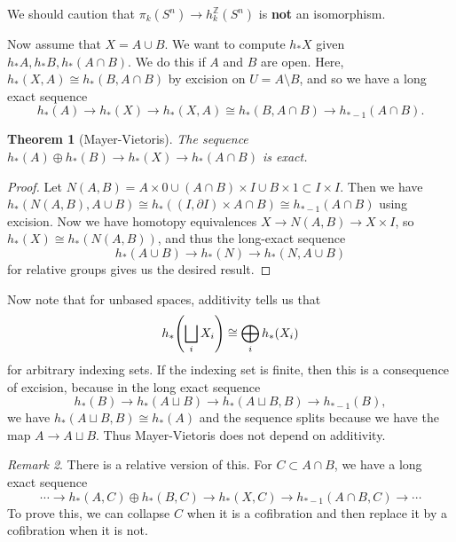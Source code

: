 \documentclass[leqno, openany]{memoir}
\newtheorem{thm}{Theorem}[section]
\theoremstyle{definition}
\theoremstyle{remark}
\newtheorem{rmk}[thm]{Remark}
\theoremstyle{plain}
\theoremstyle{definition}
\theoremstyle{remark}
\newcommand{\Z}{\mathbb{Z}}
\begin{document}
We should caution that $\pi_k(S^n) \to h_k^{\Z}(S^n)$ is \textbf{not} an isomorphism.

Now assume that $X = A \cup B$. We want to compute $h_* X$ given $h_* A, h_* B, h_*(A \cap B)$. We do this if $A$ and $B$ are open. Here, $h_*(X,A) \cong h_*(B, A \cap B)$ by excision on $U = A \setminus B$, and so we have a long exact sequence
\[ h_*(A) \to h_*(X) \to h_*(X,A) \cong h_*(B, A \cap B) \to h_{*-1}(A \cap B). \]

\begin{thm}[Mayer-Vietoris]
    The sequence $h_*(A) \oplus h_*(B) \to h_*(X) \to h_*(A \cap B)$ is exact.
\end{thm}

\begin{proof}
    Let $N(A,B) = A \times 0 \cup (A \cap B) \times I \cup B \times 1 \subset I \times I$. Then we have $h_*(N(A,B), A \cup B) \cong h_*((I, \partial I) \times A \cap B) \cong h_{*-1}(A \cap B)$ using excision. Now we have homotopy equivalences $X \to N(A,B) \to X \times I$, so $h_*(X) \cong h_*(N(A,B))$, and thus the long-exact sequence
    \[ h_*(A \cup B) \to h_*(N) \to h_*(N, A \cup B) \]
    for relative groups gives us the desired result.
\end{proof}

Now note that for unbased spaces, additivity tells us that 
\[ h_*\qty(\bigsqcup_i X_i) \cong \bigoplus_i h_*(X_i) \]
for arbitrary indexing sets. If the indexing set is finite, then this is a consequence of excision, because in the long exact sequence
\[ h_*(B) \to h_*(A \sqcup B) \to h_*(A \sqcup B, B) \to h_{*-1}(B), \]
we have $h_*(A \sqcup B, B) \cong h_*(A)$ and the sequence splits because we have the map $A \to A \sqcup B$. Thus Mayer-Vietoris does not depend on additivity.

\begin{rmk}
    There is a relative version of this. For $C \subset A \cap B$, we have a long exact sequence
    \[ \cdots \to h_*(A,C) \oplus h_*(B,C) \to h_*(X,C) \to h_{*-1}(A \cap B, C) \to \cdots \]
    To prove this, we can collapse $C$ when it is a cofibration and then replace it by a cofibration when it is not.
\end{rmk}
\end{document}
